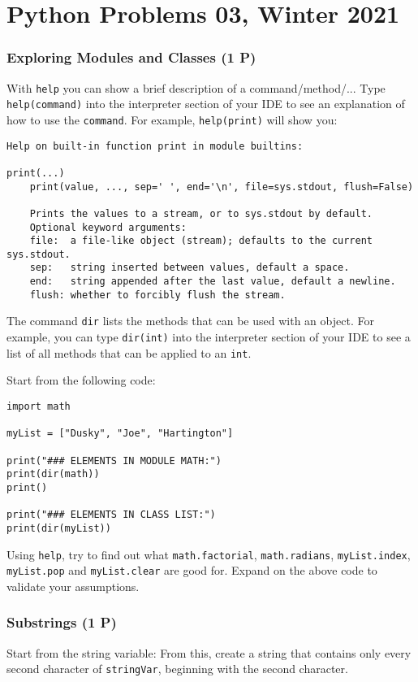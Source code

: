 \documentclass[
	ngerman,
	fontsize=10pt,
	parskip=half,
	titlepage=true,
	DIV=12
]{scrartcl}
\newcommand*{\inPy}[1]{\texttt{#1}}
\begin{document}
\part*{Python Problems 03, Winter 2021}
\section{Exploring Modules and Classes (1 P)}
With \inPy{help} you can show a brief description of a command/method/... Type \texttt{help(command)} into the interpreter section of your IDE to see an explanation of how to use the \texttt{command}. For example, \inPy{help(print)} will show you:

\begin{verbatim}
Help on built-in function print in module builtins:

print(...)
    print(value, ..., sep=' ', end='\n', file=sys.stdout, flush=False)
    
    Prints the values to a stream, or to sys.stdout by default.
    Optional keyword arguments:
    file:  a file-like object (stream); defaults to the current sys.stdout.
    sep:   string inserted between values, default a space.
    end:   string appended after the last value, default a newline.
    flush: whether to forcibly flush the stream.
\end{verbatim}

The command \inPy{dir} lists the methods that can be used with an object. For example, you can type \inPy{dir(int)} into the interpreter section of your IDE to see a list of all methods that can be applied to an \inPy{int}.


Start from the following code:
\begin{verbatim}
import math

myList = ["Dusky", "Joe", "Hartington"]

print("### ELEMENTS IN MODULE MATH:")
print(dir(math))
print()

print("### ELEMENTS IN CLASS LIST:")
print(dir(myList))
\end{verbatim}

Using \inPy{help}, try to find out what \inPy{math.factorial}, \inPy{math.radians}, \inPy{myList.index}, \inPy{myList.pop} and \inPy{myList.clear} are good for. Expand on the above code to validate your assumptions.


\section{Substrings (1 P)}
Start from the string variable:
From this, create a string that contains only every second character of \texttt{stringVar}, beginning with the second character.
\end{document}
